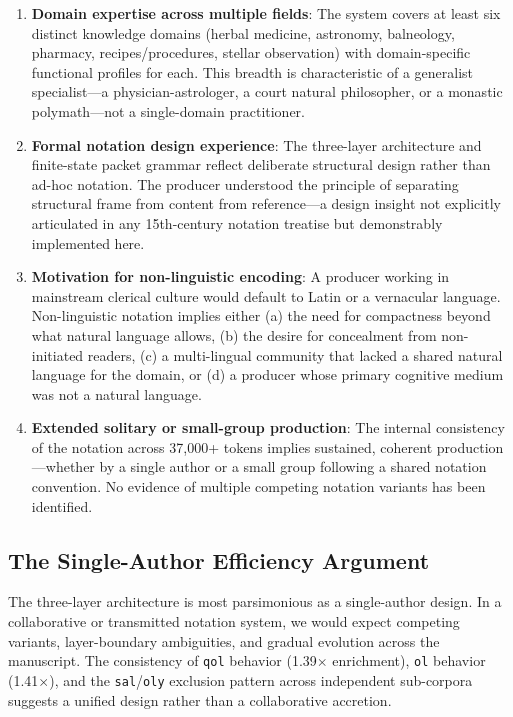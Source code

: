 \documentclass[11pt,a4paper,twocolumn]{article}
\begin{document}
\begin{enumerate}[leftmargin=*,itemsep=2pt]
    \item \textbf{Domain expertise across multiple fields}: The system covers at least six distinct knowledge domains (herbal medicine, astronomy, balneology, pharmacy, recipes/procedures, stellar observation) with domain-specific functional profiles for each. This breadth is characteristic of a generalist specialist---a physician-astrologer, a court natural philosopher, or a monastic polymath---not a single-domain practitioner.
    \item \textbf{Formal notation design experience}: The three-layer architecture and finite-state packet grammar reflect deliberate structural design rather than ad-hoc notation. The producer understood the principle of separating structural frame from content from reference---a design insight not explicitly articulated in any 15th-century notation treatise but demonstrably implemented here.
    \item \textbf{Motivation for non-linguistic encoding}: A producer working in mainstream clerical culture would default to Latin or a vernacular language. Non-linguistic notation implies either (a) the need for compactness beyond what natural language allows, (b) the desire for concealment from non-initiated readers, (c) a multi-lingual community that lacked a shared natural language for the domain, or (d) a producer whose primary cognitive medium was not a natural language.
    \item \textbf{Extended solitary or small-group production}: The internal consistency of the notation across 37,000+ tokens implies sustained, coherent production---whether by a single author or a small group following a shared notation convention. No evidence of multiple competing notation variants has been identified.
\end{enumerate}

\subsection{The Single-Author Efficiency Argument}

The three-layer architecture is most parsimonious as a single-author design. In a collaborative or transmitted notation system, we would expect competing variants, layer-boundary ambiguities, and gradual evolution across the manuscript. The consistency of \texttt{qol} behavior (1.39$\times$ enrichment), \texttt{ol} behavior (1.41$\times$), and the \texttt{sal}/\texttt{oly} exclusion pattern across independent sub-corpora suggests a unified design rather than a collaborative accretion.
\end{document}
